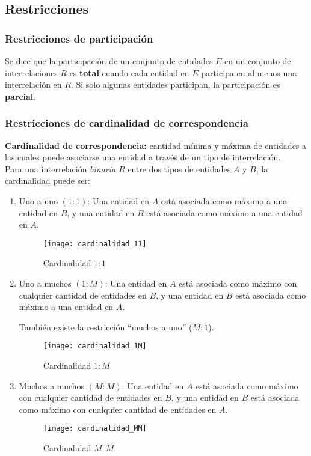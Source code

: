 \documentclass[a4paper, twoside]{article}
\begin{document}
\subsection{Restricciones}
\subsubsection{Restricciones de participación}
Se dice que la participación de un conjunto de entidades $E$ en un conjunto de interrelaciones $R$ es \textbf{total} cuando cada entidad en $E$ participa en al menos una interrelación en $R$. Si solo algunas entidades participan, la participación es \textbf{parcial}.

\subsubsection{Restricciones de cardinalidad de correspondencia}
\textbf{Cardinalidad de correspondencia:} cantidad mínima y máxima de entidades a las cuales puede asociarse una entidad a través de un tipo de interrelación.\\

Para una interrelación \emph{binaria} $R$ entre dos tipos de entidades $A$ y $B$, la cardinalidad puede ser:
\begin{enumerate}
	\item Uno a uno $(1:1)$: Una entidad en $A$ está asociada como máximo a una entidad en $B$, y una entidad en $B$ está asociada como máximo a una entidad en $A$.
	\begin{figure}[H]
		\centering
		\texttt{[image: cardinalidad\_11]}
		\caption{Cardinalidad $1:1$}
	\end{figure}

	\item Uno a muchos $(1:M)$: Una entidad en $A$ está asociada como máximo con cualquier cantidad de entidades en $B$, y una entidad en $B$ está asociada como máximo a una entidad en $A$.

	También existe la restricción ``muchos a uno'' ($M:1$).
	\begin{figure}[H]
		\centering
		\texttt{[image: cardinalidad\_1M]}
		\caption{Cardinalidad $1:M$}
	\end{figure}

	\item Muchos a muchos $(M:M)$: Una entidad en $A$ está asociada como máximo con cualquier cantidad de entidades en $B$, y una entidad en $B$ está asociada como máximo con cualquier cantidad de entidades en $A$.
	\begin{figure}[H]
		\centering
		\texttt{[image: cardinalidad\_MM]}
		\caption{Cardinalidad $M:M$}
	\end{figure}
\end{enumerate}
\end{document}
